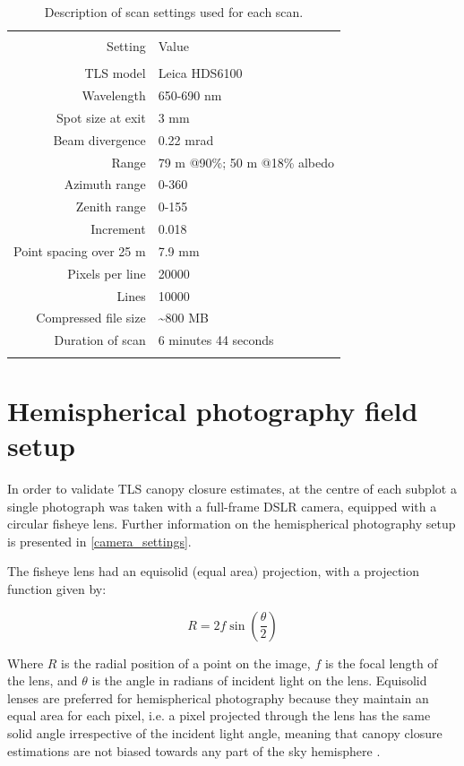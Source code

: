 \documentclass[11pt,a4paper]{article}
\begin{document}
\begin{table} \centering 
  \caption{Description of scan settings used for each scan.} 
  \label{scan_settings} 
\begin{tabular}{@{\extracolsep{0pt}} rl} 
\\[-1.8ex]\hline 
\hline \\[-1.8ex] 
{Setting} & {Value} \\
\hline \\[-1.8ex] 
TLS model & Leica HDS6100 \\
Wavelength & 650-690 nm \\
Spot size at exit & 3 mm \\
Beam divergence & 0.22 mrad \\
Range & 79 m @90\%; 50 m @18\% albedo \\
Azimuth range & 0-360\textdegree{} \\
Zenith range & 0-155\textdegree{} \\
Increment & 0.018\textdegree{} \\
Point spacing over 25 m & 7.9 mm \\
Pixels per line & \num{20000} \\
Lines & \num{10000} \\
Compressed file size & \textasciitilde{}800 MB \\
Duration of scan & 6 minutes 44 seconds \\
\hline
\hline \\[-1.8ex] 
\end{tabular} 
\end{table} 


\section{Hemispherical photography field setup}

In order to validate TLS canopy closure estimates, at the centre of each subplot a single photograph was taken with a full-frame DSLR camera, equipped with a circular fisheye lens. Further information on the hemispherical photography setup is presented in \autoref{camera_settings}.

The fisheye lens had an equisolid (equal area) projection, with a projection function given by: 

\begin{equation}
	R = 2f \sin{(\frac{\theta{}}{2})}
\end{equation}

Where $R$ is the radial position of a point on the image, $f$ is the focal length of the lens, and $\theta{}$ is the angle in radians of incident light on the lens. Equisolid lenses are preferred for hemispherical photography because they maintain an equal area for each pixel, i.e. a pixel projected through the lens has the same solid angle irrespective of the incident light angle, meaning that canopy closure estimations are not biased towards any part of the sky hemisphere \citep{Herbert1987}.
\end{document}
